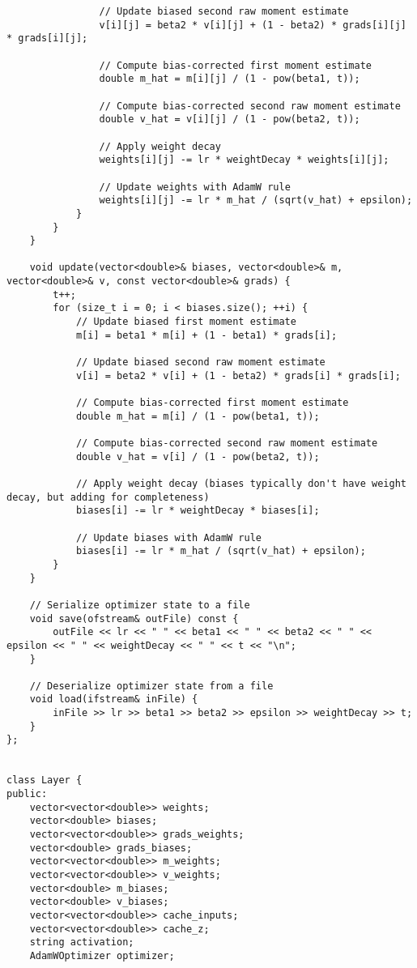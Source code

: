 \begin{verbatim}
                // Update biased second raw moment estimate
                v[i][j] = beta2 * v[i][j] + (1 - beta2) * grads[i][j] * grads[i][j];
 
                // Compute bias-corrected first moment estimate
                double m_hat = m[i][j] / (1 - pow(beta1, t));
 
                // Compute bias-corrected second raw moment estimate
                double v_hat = v[i][j] / (1 - pow(beta2, t));
 
                // Apply weight decay
                weights[i][j] -= lr * weightDecay * weights[i][j];
 
                // Update weights with AdamW rule
                weights[i][j] -= lr * m_hat / (sqrt(v_hat) + epsilon);
            }
        }
    }
 
    void update(vector<double>& biases, vector<double>& m, vector<double>& v, const vector<double>& grads) {
        t++;
        for (size_t i = 0; i < biases.size(); ++i) {
            // Update biased first moment estimate
            m[i] = beta1 * m[i] + (1 - beta1) * grads[i];
 
            // Update biased second raw moment estimate
            v[i] = beta2 * v[i] + (1 - beta2) * grads[i] * grads[i];
 
            // Compute bias-corrected first moment estimate
            double m_hat = m[i] / (1 - pow(beta1, t));
 
            // Compute bias-corrected second raw moment estimate
            double v_hat = v[i] / (1 - pow(beta2, t));
 
            // Apply weight decay (biases typically don't have weight decay, but adding for completeness)
            biases[i] -= lr * weightDecay * biases[i];
 
            // Update biases with AdamW rule
            biases[i] -= lr * m_hat / (sqrt(v_hat) + epsilon);
        }
    }
 
    // Serialize optimizer state to a file
    void save(ofstream& outFile) const {
        outFile << lr << " " << beta1 << " " << beta2 << " " << epsilon << " " << weightDecay << " " << t << "\n";
    }
 
    // Deserialize optimizer state from a file
    void load(ifstream& inFile) {
        inFile >> lr >> beta1 >> beta2 >> epsilon >> weightDecay >> t;
    }
};
 
 
class Layer {
public:
    vector<vector<double>> weights;
    vector<double> biases;
    vector<vector<double>> grads_weights;
    vector<double> grads_biases;
    vector<vector<double>> m_weights;
    vector<vector<double>> v_weights;
    vector<double> m_biases;
    vector<double> v_biases;
    vector<vector<double>> cache_inputs;
    vector<vector<double>> cache_z;
    string activation;
    AdamWOptimizer optimizer;
 

\end{verbatim}
